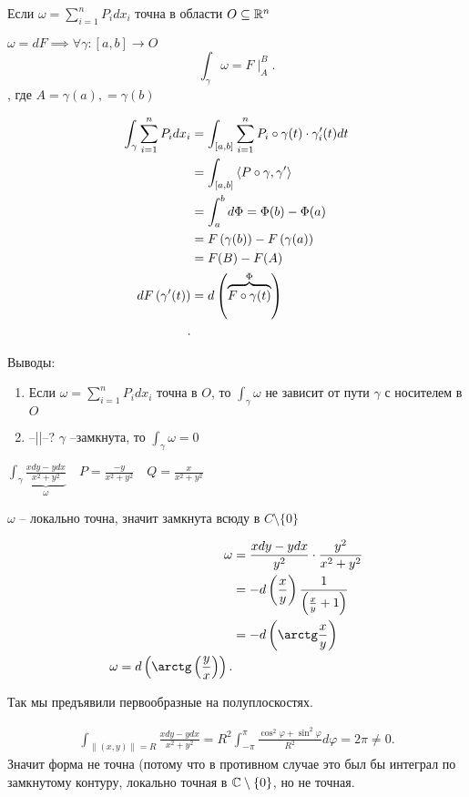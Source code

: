 \begin{statement}
    Если $\omega = \sum_{i=1}^{n} P_idx_i$ точна в области $O\subseteq \mathbb{R}^n$

    $\omega = dF \implies \forall \gamma:[a,b] \to O$
    \[
        \int_\gamma\omega = F\mid_A^B
    .\] , где $A = \gamma(a),  = \gamma(b)$ 
    
    \begin{align*}
        \int_\gamma \sum_{i=1}^{n} P_idx_i &= \int_{[a,b]} \sum_{i=1}^{n} P_i\circ \gamma(t)\cdot \p \gamma_i(t)dt \\
                                           &= \int_{[a,b]}\left<P\circ \gamma, \p \gamma \right> \\
                                           &= \int_a^b d\Phi = \Phi(b) - \Phi(a) \\
                                           &= F\left( \gamma(b) \right)  - F\left( \gamma(a) \right)  \\
                                           &= F(B) - F(A) \\
        dF\left( \p \gamma(t) \right)  &= d\left( \overbrace{F\circ \gamma(t)}^{\Phi} \right)  \\
    .\end{align*}

    Выводы:
    \begin{enumerate}
        \item Если $\omega = \sum_{i=1}^{n} P_idx_i$ точна в $O$, то  $\int_\gamma \omega$ не зависит от пути  $\gamma$ с носителем в $O$
        \item --||--?  $\gamma$ --замкнута, то  $\int_\gamma\omega = 0$
    \end{enumerate}
\end{statement}

\begin{example}
    $\int_\gamma\underbrace{\frac{xdy-ydx}{x^2+y^2}}_{\omega}\quad P = \frac{-y}{x^2+y^2}\quad Q = \frac{x}{x^2+y^2}$

    $\omega$ -- локально точна, значит замкнута всюду в  $C\setminus \{0\}$

    \begin{align*}
        \omega &= \frac{xdy - ydx}{y^2} \cdot \frac{y^2}{x^2+y^2}\\
               &= -d\left( \frac{x}{y} \right) \frac{1}{\left( \frac{x}{y}+1 \right) } \\
               &= -d\left( \arctg \frac{x}{y} \right)\\
               \omega = d\left( \arctg \left( \frac{y}{x} \right)  \right) 
    .\end{align*}

    Так мы предъявили первообразные на полуплоскостях.

    \begin{align*}
        \int_{\|(x,y)\| = R} \frac{xdy - ydx}{x^2+y^2} = R^2 \int_{-\pi }^{\pi } \frac{\cos ^2\varphi + \sin ^2\varphi}{R^2}d\varphi = 2\pi  \neq 0
    .\end{align*}
    Значит форма не точна (потому что в противном случае это был бы интеграл по замкнутому контуру, локально точная в $\mathbb{C}\setminus \{0\}$, но не точная.
\end{example}
